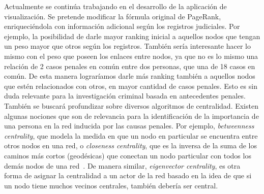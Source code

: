 Actualmente se 	continúa trabajando en el desarrollo de la aplicación de visualización. Se pretende modificar la fórmula original de PageRank, enriqueciéndola con información adicional según los registros judiciales. Por ejemplo, la posibilidad de darle mayor ranking inicial a aquellos nodos que tengan un peso mayor que otros según los registros. También sería interesante hacer lo mismo con el peso que poseen los enlaces entre nodos, ya que no es lo mismo una relación de 2 casos penales en común entre dos personas, que una de 18 casos en común. De esta manera lograríamos darle más ranking también a aquellos nodos que estén relacionados con otros, en mayor cantidad de casos penales. Esto es sin duda relevante para la investigación criminal basada en antecedentes penales.
También se buscará profundizar sobre diversos algoritmos de centralidad. Existen algunas nociones que son de relevancia para la identificación de la importancia de una persona en la red inducida por las causas penales. Por ejemplo, \textit{betweenness centrality}, que modela la medida en que un nodo en particular se encuentra entre otros nodos en una red, o \textit{closeness centrality}, que es la inversa de la suma de los caminos más cortos (geodésicas) que conectan un nodo particular con todos los demás nodos de una red~\cite{newman2005measure}. De manera similar, \textit{eigenvector centrality}, es otra forma de asignar la centralidad a un actor de la red basado en la idea de que si un nodo tiene muchos vecinos centrales, también debería ser central.
 